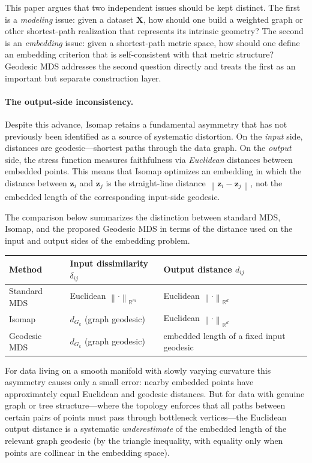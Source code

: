 \documentclass[11pt]{article}
\newcommand{\R}{\mathbb{R}}
\newcommand{\bX}{\mathbf{X}}
\newcommand{\bz}{\mathbf{z}}
\newcommand{\norm}[1]{\left\|#1\right\|}
\theoremstyle{definition}
\theoremstyle{plain}
\theoremstyle{remark}
\begin{document}
This paper argues that two independent issues should be kept distinct.  The
first is a \emph{modeling} issue: given a dataset $\bX$, how should one build
a weighted graph or other shortest-path realization that represents its
intrinsic geometry?  The second is an \emph{embedding} issue: given a
shortest-path metric space, how should one define an embedding criterion that
is self-consistent with that metric structure?  Geodesic MDS addresses the
second question directly and treats the first as an important but separate
construction layer.

\paragraph{The output-side inconsistency.}

Despite this advance, Isomap retains a fundamental asymmetry that has not
previously been identified as a source of systematic distortion.  On the
\emph{input} side, distances are geodesic---shortest paths through the data
graph.  On the \emph{output} side, the stress function measures faithfulness
via \emph{Euclidean} distances between embedded points.  This means that
Isomap optimizes an embedding in which the distance between $\bz_i$ and
$\bz_j$ is the straight-line distance $\norm{\bz_i - \bz_j}$, not the
embedded length of the corresponding input-side geodesic.

The comparison below summarizes the distinction between standard MDS,
Isomap, and the proposed Geodesic MDS in terms of the distance used on
the input and output sides of the embedding problem.

\begin{center}
  \small
  \begin{tabular}{@{}p{}p{}p{}@{}}
    \toprule
    Method & Input dissimilarity $\delta_{ij}$ & Output distance $d_{ij}$ \\
    \midrule
    Standard MDS & Euclidean $\norm{\cdot}_{\R^m}$ & Euclidean $\norm{\cdot}_{\R^d}$ \\
    Isomap & $d_{G_k}$ (graph geodesic) & Euclidean $\norm{\cdot}_{\R^d}$ \\
    Geodesic MDS & $d_{G_k}$ (graph geodesic) & embedded length of a fixed input geodesic \\
    \bottomrule
  \end{tabular}
\end{center}

For data living on a smooth manifold with slowly varying curvature this
asymmetry causes only a small error: nearby embedded points have
approximately equal Euclidean and geodesic distances.  But for data with
genuine graph or tree structure---where the topology enforces that all
paths between certain pairs of points must pass through bottleneck
vertices---the Euclidean output distance is a systematic \emph{underestimate}
of the embedded length of the relevant graph geodesic (by the triangle inequality, with
equality only when points are collinear in the embedding space).
\end{document}
